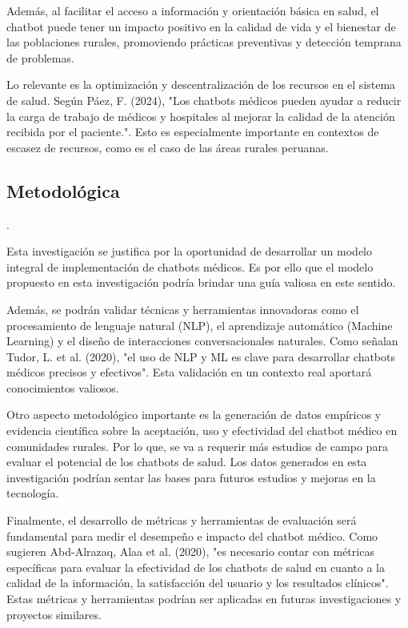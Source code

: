 Además, al facilitar el acceso a información y orientación básica en salud, el chatbot puede tener un impacto positivo en la calidad de vida y el bienestar de las poblaciones rurales, promoviendo prácticas preventivas y detección temprana de problemas.

Lo relevante es la optimización y descentralización de los recursos en el sistema de salud. Según Páez, F. (2024), "Los chatbots médicos pueden ayudar a reducir la carga de trabajo de médicos y hospitales al mejorar la calidad de la atención recibida por el paciente.". Esto es especialmente importante en contextos de escasez de recursos, como es el caso de las áreas rurales peruanas.

\subsection{Metodológica}. 

Esta investigación se justifica por la oportunidad de desarrollar un modelo integral de implementación de chatbots médicos. Es por ello que el modelo propuesto en esta investigación podría brindar una guía valiosa en este sentido.

Además, se podrán validar técnicas y herramientas innovadoras como el procesamiento de lenguaje natural (NLP), el aprendizaje automático (Machine Learning) y el diseño de interacciones conversacionales naturales. Como señalan Tudor, L. et al. (2020), "el uso de NLP y ML es clave para desarrollar chatbots médicos precisos y efectivos". Esta validación en un contexto real aportará conocimientos valiosos.

Otro aspecto metodológico importante es la generación de datos empíricos y evidencia científica sobre la aceptación, uso y efectividad del chatbot médico en comunidades rurales. Por lo que, se va a requerir más estudios de campo para evaluar el potencial de los chatbots de salud. Los datos generados en esta investigación podrían sentar las bases para futuros estudios y mejoras en la tecnología.

Finalmente, el desarrollo de métricas y herramientas de evaluación será fundamental para medir el desempeño e impacto del chatbot médico. Como sugieren Abd-Alrazaq, Alaa et al. (2020), "es necesario contar con métricas específicas para evaluar la efectividad de los chatbots de salud en cuanto a la calidad de la información, la satisfacción del usuario y los resultados clínicos". Estas métricas y herramientas podrían ser aplicadas en futuras investigaciones y proyectos similares.

